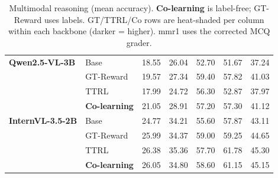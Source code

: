 \begin{table}[t]
\begin{tabular}{ll ccccc}
\midrule
\textbf{Qwen2.5-VL-3B} & Base & 18.55 & 26.04 & 52.70 & 51.67 & 37.24 \\
 & GT-Reward & \cellcolor{heat!33}19.57 & \cellcolor{heat!39}27.34 & \cellcolor{heat!58}59.40 & \cellcolor{heat!58}57.82 & \cellcolor{heat!57}41.03 \\
 & TTRL & \cellcolor{heat!6}17.99 & \cellcolor{heat!6}24.72 & \cellcolor{heat!6}56.30 & \cellcolor{heat!6}52.87 & \cellcolor{heat!6}37.97 \\
 & \textbf{Co-learning} & \cellcolor{heat!58}21.05 & \cellcolor{heat!58}28.91 & \cellcolor{heat!21}57.20 & \cellcolor{heat!53}57.30 & \cellcolor{heat!58}41.12 \\
\textbf{InternVL-3.5-2B} & Base & 24.77 & 34.21 & 55.60 & 57.87 & 43.11 \\
 & GT-Reward & \cellcolor{heat!6}25.99 & \cellcolor{heat!6}34.37 & \cellcolor{heat!58}59.00 & \cellcolor{heat!6}59.25 & \cellcolor{heat!6}44.65 \\
 & TTRL & \cellcolor{heat!58}26.38 & \cellcolor{heat!58}35.36 & \cellcolor{heat!6}57.70 & \cellcolor{heat!58}61.78 & \cellcolor{heat!58}45.30 \\
 & \textbf{Co-learning} & \cellcolor{heat!14}26.05 & \cellcolor{heat!29}34.80 & \cellcolor{heat!42}58.60 & \cellcolor{heat!45}61.15 & \cellcolor{heat!46}45.15 \\
\bottomrule
\end{tabular}
\caption{Multimodal reasoning (mean accuracy). \textbf{Co-learning} is label-free; GT-Reward uses labels. GT/TTRL/Co rows are heat-shaded per column within each backbone (darker = higher). mmr1 uses the corrected MCQ grader.}
\label{tab:mllm}
\end{table}